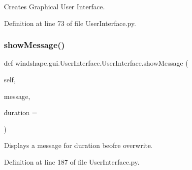 \begin{DoxyVerb}Creates Graphical User Interface.\end{DoxyVerb}
 

Definition at line 73 of file User\+Interface.\+py.

\mbox{\label{classwindshape_1_1gui_1_1_user_interface_1_1_user_interface_abec836d949600735c76645000a412826}} 
\subsubsection{\texorpdfstring{show\+Message()}{showMessage()}}
{\footnotesize\ttfamily def windshape.\+gui.\+User\+Interface.\+User\+Interface.\+show\+Message (\begin{DoxyParamCaption}\item[{}]{self,  }\item[{}]{message,  }\item[{}]{duration = {} }\end{DoxyParamCaption})}

\begin{DoxyVerb}Displays a message for duration beofre overwrite.\end{DoxyVerb}
 

Definition at line 187 of file User\+Interface.\+py.

